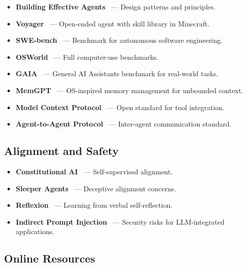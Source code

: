 \begin{itemize}
  \item \textbf{Building Effective Agents}~\cite{anthropic2024buildingagents} --- Design patterns and principles.
  \item \textbf{Voyager}~\cite{wang2023voyager} --- Open-ended agent with skill library in Minecraft.
  \item \textbf{SWE-bench}~\cite{jimenez2024swebench} --- Benchmark for autonomous software engineering.
  \item \textbf{OSWorld}~\cite{xie2024osworld} --- Full computer-use benchmarks.
  \item \textbf{GAIA}~\cite{mialon2023gaia} --- General AI Assistants benchmark for real-world tasks.
  \item \textbf{MemGPT}~\cite{packer2023memgpt} --- OS-inspired memory management for unbounded context.
  \item \textbf{Model Context Protocol}~\cite{anthropic-mcp-2024} --- Open standard for tool integration.
  \item \textbf{Agent-to-Agent Protocol}~\cite{google-a2a-2025} --- Inter-agent communication standard.
\end{itemize}

\subsection{Alignment and Safety}
\label{alignment-and-safety}

\begin{itemize}
  \item \textbf{Constitutional AI}~\cite{bai2022constitutional} --- Self-supervised alignment.
  \item \textbf{Sleeper Agents}~\cite{hubinger2024sleeper} --- Deceptive alignment concerns.
  \item \textbf{Reflexion}~\cite{shinn2023reflexion} --- Learning from verbal self-reflection.
  \item \textbf{Indirect Prompt Injection}~\cite{greshake2023indirect} --- Security risks for LLM-integrated applications.
\end{itemize}

\subsection{Online Resources}
\label{online-resources}

